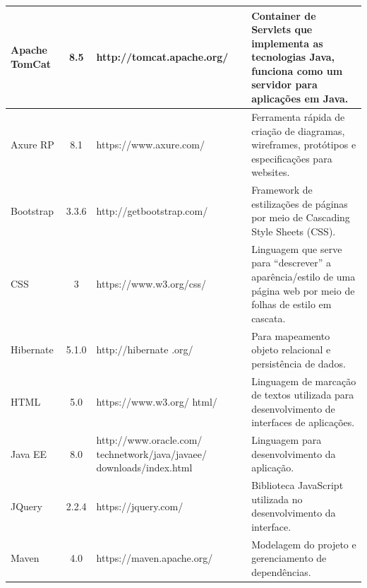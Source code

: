 \begin{center}
\begin{longtable}{|C{3.0 cm}|c|C{4.5 cm}|L{5cm}|}
Apache TomCat & 8.5 & http://\-tomcat.\-apache.\-org/ & Container de Servlets 
que implementa as tecnologias Java, funciona como um servidor para aplicações em Java. \\ \hline
Axure RP & 8.1 & https://www.axure.com/ & Ferramenta rápida de criação de diagramas, wireframes, protótipos e especificações para websites. \\ \hline
Bootstrap                        & 3.3.6           & http://getbootstrap.com/                                           & Framework de estilizações de páginas por meio de Cascading Style Sheets (CSS).                                                                         \\ \hline
CSS                              & 3               & https://www.w3.org/css/                                            & Linguagem que serve para “descrever” a aparência/estilo de uma página web por meio de folhas de estilo em cascata.                                     \\ \hline
Hibernate                        & 5.1.0           & http://hibernate .org/                                             & Para mapeamento objeto relacional e persistência de dados.                                                                                             \\ \hline
HTML                             & 5.0             & https://www.w3.org/
html/                                           & Linguagem de marcação de textos utilizada para desenvolvimento de interfaces de aplicações.                                                            \\ \hline
Java EE                          & 8.0             & http://www.oracle.com/
technetwork/java/javaee/
downloads/index.html & Linguagem para desenvolvimento da aplicação.                                                                                                           \\ \hline
JQuery                           & 2.2.4           & https://jquery.com/                                                & Biblioteca JavaScript utilizada no desenvolvimento da interface.                                                                                       \\ \hline
Maven                            & 4.0             & https://\-maven.\-apache.\-org/                                          & Modelagem do projeto e gerenciamento de dependências.                                                                                                  \\ \hline

\end{longtable}
\end{center}
